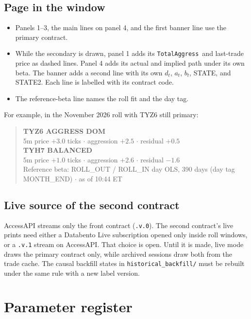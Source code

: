 \documentclass[11pt]{article}
\newcommand{\TotalAggress}{\texttt{TotalAggress}}
\begin{document}
\subsection{Page in the window}

\begin{itemize}
    \item Panels 1--3, the main lines on panel 4, and the first banner line use the primary contract.
    \item While the secondary is drawn, panel 1 adds its \TotalAggress\ and last-trade price as dashed lines. Panel 4 adds its actual and implied path under its own beta. The banner adds a second line with its own $d_t$, $a_t$, $b_t$, STATE, and STATE2. Each line is labelled with its contract code.
    \item The reference-beta line names the roll fit and the day tag.
\end{itemize}

For example, in the November 2026 roll with TYZ6 still primary:
\begin{quote}
\textbf{TYZ6 \quad AGGRESS DOM}\\
5m price $+3.0$ ticks $\cdot$ aggression $+2.5$ $\cdot$ residual $+0.5$\\
\textbf{TYH7 \quad BALANCED}\\
5m price $+1.0$ ticks $\cdot$ aggression $+2.6$ $\cdot$ residual $-1.6$\\
Reference beta: ROLL\_OUT / ROLL\_IN day OLS, 390 days (day tag MONTH\_END) $\cdot$ as of 10:44 ET
\end{quote}

\subsection{Live source of the second contract}

AccessAPI streams only the front contract (\texttt{.v.0}). The second contract's live prints need either a Databento Live subscription opened only inside roll windows, or a \texttt{.v.1} stream on AccessAPI. That choice is open. Until it is made, live mode draws the primary contract only, while archived sessions draw both from the trade cache. The causal backfill states in \texttt{historical\_backfill/} must be rebuilt under the same rule with a new label version.

\section{Parameter register}
\end{document}
